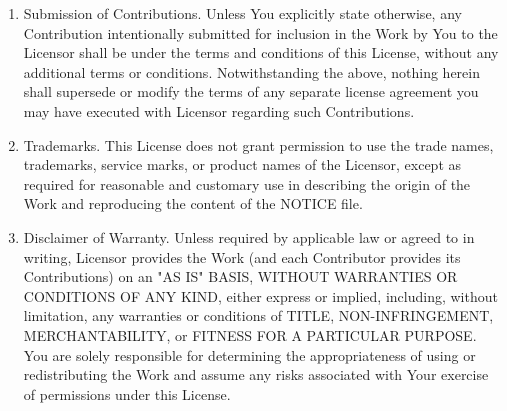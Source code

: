 \begin{enumerate}
(d) If the Work includes a "NOTICE" text file as part of its
distribution, then any Derivative Works that You distribute must
include a readable copy of the attribution notices contained
within such NOTICE file, excluding those notices that do not
pertain to any part of the Derivative Works, in at least one
of the following places: within a NOTICE text file distributed
as part of the Derivative Works; within the Source form or
documentation, if provided along with the Derivative Works; or,
within a display generated by the Derivative Works, if and
wherever such third-party notices normally appear. The contents
of the NOTICE file are for informational purposes only and
do not modify the License. You may add Your own attribution
notices within Derivative Works that You distribute, alongside
or as an addendum to the NOTICE text from the Work, provided
that such additional attribution notices cannot be construed
as modifying the License.

You may add Your own copyright statement to Your modifications and
may provide additional or different license terms and conditions
for use, reproduction, or distribution of Your modifications, or
for any such Derivative Works as a whole, provided Your use,
reproduction, and distribution of the Work otherwise complies with
the conditions stated in this License.

\item   Submission of Contributions.
Unless You explicitly state otherwise,
any Contribution intentionally submitted for inclusion in the Work
by You to the Licensor shall be under the terms and conditions of
this License, without any additional terms or conditions.
Notwithstanding the above, nothing herein shall supersede or modify
the terms of any separate license agreement you may have executed
with Licensor regarding such Contributions.

\item   Trademarks.
This License does not grant permission to use the trade
names, trademarks, service marks, or product names of the Licensor,
except as required for reasonable and customary use in describing the
origin of the Work and reproducing the content of the NOTICE file.

\item   Disclaimer of Warranty.
Unless required by applicable law or
agreed to in writing, Licensor provides the Work (and each
Contributor provides its Contributions) on an "AS IS" BASIS,
WITHOUT WARRANTIES OR CONDITIONS OF ANY KIND, either express or
implied, including, without limitation, any warranties or conditions
of TITLE, NON-INFRINGEMENT, MERCHANTABILITY, or FITNESS FOR A
PARTICULAR PURPOSE. You are solely responsible for determining the
appropriateness of using or redistributing the Work and assume any
risks associated with Your exercise of permissions under this License.


\end{enumerate}
